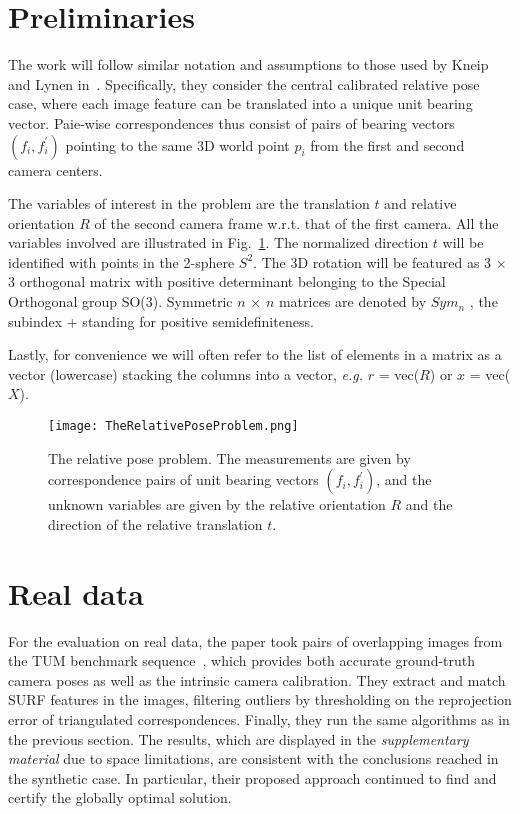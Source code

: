 \documentclass[10pt,twocolumn,letterpaper]{article}
\begin{document}
\section{Preliminaries}
The work will follow similar notation and assumptions to those used by Kneip and Lynen in~\cite{Kneip2014Direct}. Specifically, they consider the central calibrated relative pose case, where each image feature can be translated into a unique unit bearing vector. Paie-wise correspondences thus consist of pairs of bearing vectors $(f_i, f_i^{'})$ pointing to the same 3D world point $p_i$ from the first and second camera centers.\par
The variables of interest in the problem are the translation $t$ and relative orientation $R$ of the second camera frame w.r.t. that of the first camera. All the variables involved are illustrated in Fig.~\ref{fig:Problen}. The normalized direction $t$ will be identified with points in the 2-sphere $S^2$. The 3D rotation
will be featured as 3 $ \times $ 3 orthogonal matrix with positive determinant belonging to the Special Orthogonal group SO(3). Symmetric $n$ $ \times $ $n$ matrices are denoted by $Sym_n$ , the subindex + standing for positive semidefiniteness.\par
Lastly, for convenience we will often refer to the list of elements in a matrix as a vector (lowercase) stacking the columns into a vector, \emph{e.g.} $r$ = vec($R$) or $x$ = vec($X$).\par

\begin{figure}[!htp]
\begin{center}
   \texttt{[image: TheRelativePoseProblem.png]}
\end{center}
   \caption{The relative pose problem. The measurements are given
by correspondence pairs of unit bearing vectors $(f_i, f_i^{'})$, and the
unknown variables are given by the relative orientation $R$ and the
direction of the relative translation $t$.\cite{Briales_2018_CVPR}}
\label{fig:Problen}
\end{figure}

\section{Real data}
For the evaluation on real data, the paper took pairs of overlapping images from the TUM benchmark sequence~\cite{Sturm2012A}, which provides both accurate ground-truth camera poses as well as the intrinsic camera calibration. They extract and match SURF features in the images, filtering outliers by thresholding on the reprojection error of triangulated correspondences. Finally, they run the same algorithms as in the previous section. The results, which are displayed in the \emph{supplementary material} due to space limitations, are consistent with the conclusions reached in the synthetic case. In particular, their proposed approach continued to find and certify the globally optimal solution.\par
\end{document}
